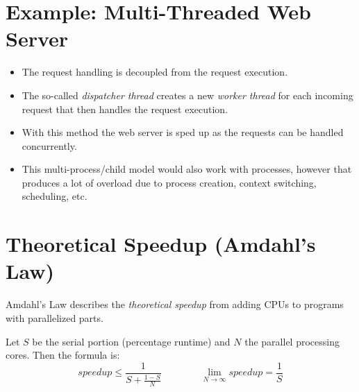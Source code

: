 \documentclass[a4paper, 11pt, accentcolor = tud3b]{tudreport}
\begin{document}
        \section{Example: Multi-Threaded Web Server}
            \begin{itemize}
            	\item The request handling is decoupled from the request execution.
            	\item The so-called \textit{dispatcher thread} creates a new \textit{worker thread} for each incoming request that then handles the request execution.
            	\item With this method the web server is sped up as the requests can be handled concurrently.
            	\item This multi-process/child model would also work with processes, however that produces a lot of overload due to process creation, context switching, scheduling, etc.
            \end{itemize}

        \section{Theoretical Speedup (Amdahl's Law)}
            Amdahl's Law describes the \textit{theoretical speedup} from adding CPUs to programs with parallelized parts.
            
            Let \(S\) be the serial portion (percentage runtime) and \(N\) the parallel processing cores. Then the formula is:
            \begin{equation*}
	            \textit{speedup} \leq \frac{1}{S + \frac{1 - S}{N}} \qquad\qquad \lim\limits_{N \rightarrow \infty} \textit{speedup} = \frac{1}{S}
            \end{equation*}
\end{document}
